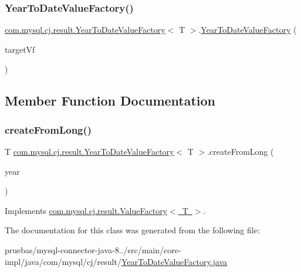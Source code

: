 \subsubsection{\texorpdfstring{Year\+To\+Date\+Value\+Factory()}{YearToDateValueFactory()}}
{\footnotesize\ttfamily \mbox{\hyperlink{classcom_1_1mysql_1_1cj_1_1result_1_1_year_to_date_value_factory}{com.\+mysql.\+cj.\+result.\+Year\+To\+Date\+Value\+Factory}}$<$ T $>$.\mbox{\hyperlink{classcom_1_1mysql_1_1cj_1_1result_1_1_year_to_date_value_factory}{Year\+To\+Date\+Value\+Factory}} (\begin{DoxyParamCaption}\item[{\mbox{\hyperlink{interfacecom_1_1mysql_1_1cj_1_1result_1_1_value_factory}{Value\+Factory}}$<$ T $>$}]{target\+Vf }\end{DoxyParamCaption})}



\subsection{Member Function Documentation}
\mbox{\label{classcom_1_1mysql_1_1cj_1_1result_1_1_year_to_date_value_factory_a3da51ee200c8868b0a8e2c84cecdb8c1}} 
\subsubsection{\texorpdfstring{create\+From\+Long()}{createFromLong()}}
{\footnotesize\ttfamily T \mbox{\hyperlink{classcom_1_1mysql_1_1cj_1_1result_1_1_year_to_date_value_factory}{com.\+mysql.\+cj.\+result.\+Year\+To\+Date\+Value\+Factory}}$<$ T $>$.create\+From\+Long (\begin{DoxyParamCaption}\item[{long}]{year }\end{DoxyParamCaption})}



Implements \mbox{\hyperlink{interfacecom_1_1mysql_1_1cj_1_1result_1_1_value_factory_a48c32868f2e3efac502522211a40f642}{com.\+mysql.\+cj.\+result.\+Value\+Factory$<$ T $>$}}.



The documentation for this class was generated from the following file\+:\begin{DoxyCompactItemize}
\item 
pruebas/mysql-\/connector-\/java-\/8../src/main/core-\/impl/java/com/mysql/cj/result/\mbox{\hyperlink{_year_to_date_value_factory_8java}{Year\+To\+Date\+Value\+Factory.\+java}}\end{DoxyCompactItemize}
